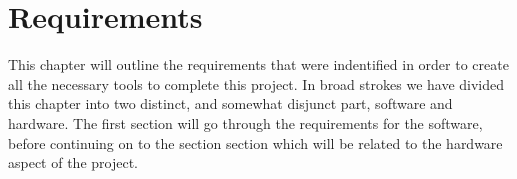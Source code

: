 \chapter{Requirements}
	This chapter will outline the requirements that were indentified in order to create all the necessary tools to complete this project. 
	In broad strokes we have divided this chapter into two distinct, and somewhat disjunct part, software and hardware. 
	The first section will go through the requirements for the software, before continuing on to the section section which will be related to the hardware aspect of the project.
	


